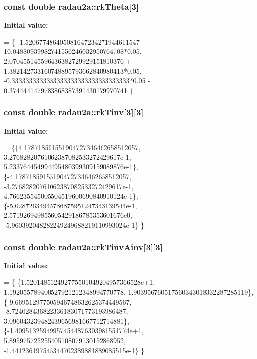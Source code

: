 \subsubsection[{\texorpdfstring{rk\+Theta}{rkTheta}}]{\setlength{\rightskip}{0pt plus 5cm}const double radau2a\+::rk\+Theta\mbox{[}3\mbox{]}\hspace{0.3cm}{\ttfamily [static]}}\hypertarget{group__Parameters_ga905a164e07054850af60562b36b1aa9f}{}\label{group__Parameters_ga905a164e07054850af60562b36b1aa9f}
{\bfseries Initial value\+:}
\begin{DoxyCode}
= \{
    -1.520677486405081647234271944611547 - 10.04880939982741556246032950764708*0.05,
    2.070455145596436382729929151810376 + 1.382142733160748895793662840980413*0.05,
    -0.3333333333333333333333333333333333*0.05 - 0.3744441479783868387391430179970741
    \}
\end{DoxyCode}
\subsubsection[{\texorpdfstring{rk\+Tinv}{rkTinv}}]{\setlength{\rightskip}{0pt plus 5cm}const double radau2a\+::rk\+Tinv\mbox{[}3\mbox{]}\mbox{[}3\mbox{]}\hspace{0.3cm}{\ttfamily [static]}}\hypertarget{group__Parameters_ga967c2bc749d9b8cda1585bf4ee50b1c1}{}\label{group__Parameters_ga967c2bc749d9b8cda1585bf4ee50b1c1}
{\bfseries Initial value\+:}
\begin{DoxyCode}
=
\{\{4.178718591551904727346462658512057,
3.27682820761062387082533272429617e-1,
5.233764454994495480399309159089876e-1\},
\{-4.178718591551904727346462658512057,
-3.27682820761062387082533272429617e-1,
4.766235545005504519600690840910124e-1\},
\{-5.02872634945786875951247343139544e-1,
2.571926949855605429186785353601676e0,
-5.960392048282249249688219110993024e-1\}
\}
\end{DoxyCode}
\subsubsection[{\texorpdfstring{rk\+Tinv\+Ainv}{rkTinvAinv}}]{\setlength{\rightskip}{0pt plus 5cm}const double radau2a\+::rk\+Tinv\+Ainv\mbox{[}3\mbox{]}\mbox{[}3\mbox{]}\hspace{0.3cm}{\ttfamily [static]}}\hypertarget{group__Parameters_ga048232e984719eb1fed3f8ba7fb4c25b}{}\label{group__Parameters_ga048232e984719eb1fed3f8ba7fb4c25b}
{\bfseries Initial value\+:}
\begin{DoxyCode}
= \{
\{1.520148562492775501049204957366528e+1,
1.192055789400527921212348994770778,
1.903956760517560343018332287285119\},
\{-9.669512977505946748632625374449567,
-8.724028436822336183071773193986487,
3.096043239482439656981667712714881\},
\{-1.409513259499574544876303981551774e+1,
5.895975725255405108079130152868952,
-1.441236197545344702389881889085515e-1\}
\}
\end{DoxyCode}
